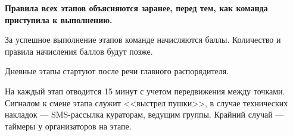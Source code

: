 
\par \textbf{Правила всех этапов объясняются заранее, перед тем, как команда приступила к выполнению.}
\par За успешное выполнение этапов команде начисляются баллы. Количество и правила начисления баллов будут позже.
\par Дневные этапы стартуют после речи главного распорядителя.
\par На каждый этап отводится 15 минут с учетом передвижения между точками. Сигналом к смене этапа служит <<выстрел пушки>>, в случае технических накладок --- SMS-рассылка кураторам, ведущим группы. Крайний случай --- таймеры у организаторов на этапе.










